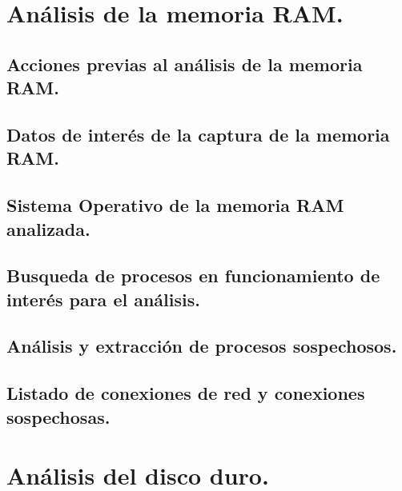 \documentclass[12pt,a4paper]{report}
\begin{document}
\chapter{Análisis de la memoria RAM.}


\section{Acciones previas al análisis de la memoria RAM.}


\section{Datos de interés de la captura de la memoria RAM.}


\section{Sistema Operativo de la memoria RAM analizada.}


\section{Busqueda de procesos en funcionamiento de interés para el análisis.}


\section{Análisis y extracción de procesos sospechosos.}


\section{Listado de conexiones de red y conexiones sospechosas.}


\chapter{Análisis del disco duro.}

\end{document}
